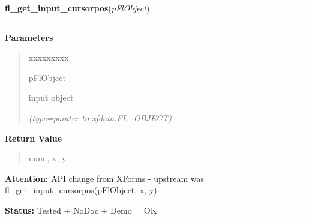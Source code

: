 \hspace{.8\funcindent}\begin{boxedminipage}{\funcwidth}

    \raggedright \textbf{fl\_get\_input\_cursorpos}(\textit{pFlObject})

    \vspace{-1.5ex}

    \rule{\textwidth}{0.5\fboxrule}
\setlength{\parskip}{2ex}
\setlength{\parskip}{1ex}
      \textbf{Parameters}
      \vspace{-1ex}

      \begin{quote}
        \begin{Ventry}{xxxxxxxxx}

          \item[pFlObject]

          input object

            {\it (type=pointer to xfdata.FL\_OBJECT)}

        \end{Ventry}

      \end{quote}

      \textbf{Return Value}
    \vspace{-1ex}

      \begin{quote}
      num., x, y

      \end{quote}

\textbf{Attention:} API change from XForms - upstream was fl\_get\_input\_cursorpos(pFlObject, 
x, y)



\textbf{Status:} Tested + NoDoc + Demo = OK



    \end{boxedminipage}

    \label{xformslib:flinput:fl_set_input_cursor_visible}

    \vspace{0.5ex}

